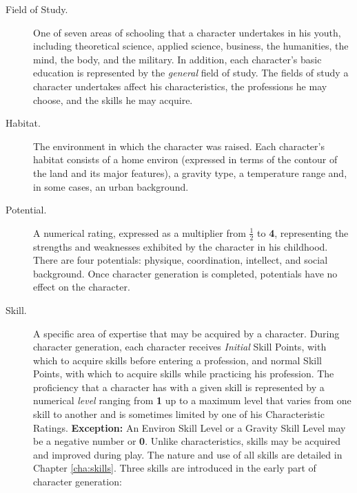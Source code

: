 \begin{description}
\item[Field of Study.] One of seven areas of schooling that a
  character undertakes in his youth, including theoretical science,
  applied science, business, the humanities, the mind, the body, and
  the military. In addition, each character's basic education is
  represented by the \emph{general} field of study. The fields of
  study a character undertakes affect his characteristics, the
  professions he may choose, and the skills he may acquire.
\item[Habitat.] The environment in which the character was raised.
  Each character's habitat consists of a home environ (expressed in
  terms of the contour of the land and its major features), a gravity
  type, a temperature range and, in some cases, an urban background.
\item[Potential.] A numerical rating, expressed as a multiplier from
  \textbf{$\frac12$} to \textbf{4}, representing the strengths and
  weaknesses exhibited by the character in his childhood. There are
  four potentials: physique, coordination, intellect, and social
  background. Once character generation is completed, potentials have
  no effect on the character.
\item[Skill.] A specific area of expertise that may be acquired by a
  character. During character generation, each character receives
  \emph{Initial} Skill Points, with which to acquire skills before
  entering a profession, and normal Skill Points, with which to
  acquire skills while practicing his profession. The proficiency that
  a character has with a given skill is represented by a numerical
  \emph{level} ranging from \textbf{1} up to a maximum level that
  varies from one skill to another and is sometimes limited by one of
  his Characteristic Ratings.  \textbf{Exception:} An Environ Skill
  Level or a Gravity Skill Level may be a negative number or
  \textbf{0}.  Unlike characteristics, skills may be acquired and
  improved during play. The nature and use of all skills are detailed
  in Chapter \ref{cha:skills}.  Three skills are introduced in the
  early part of character generation:


\end{description}
